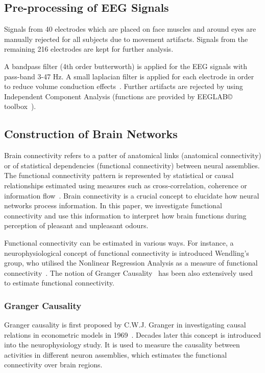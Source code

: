\subsection{Pre-processing of EEG Signals}
Signals from 40 electrodes which are placed on face muscles and around eyes are manually rejected for all subjects due to movement artifacts. Signals from the remaining 216 electrodes are kept for further analysis. 

A bandpass filter (4th order butterworth) is applied for the EEG signals with pass-band 3-47 Hz. A small laplacian filter is applied for each electrode in order to reduce volume conduction effects~\cite{wolters2007volume}. Further artifacts are rejected by using Independent Component Analysis (functions are provided by EEGLAB\copyright~ toolbox~\cite{luck2014introduction}). 

\subsection{Construction of Brain Networks}
Brain connectivity refers to a patter of anatomical links (anatomical connectivity) or of statistical dependencies (functional connectivity) between neural assemblies. The functional connectivity pattern is represented by statistical or causal relationships estimated using measures such as cross-correlation, coherence or information flow~\cite{sporns2007brain}. Brain connectivity is a crucial concept to elucidate how neural networks process information. In this paper, we investigate functional connectivity and use this information to interpret how brain functions during perception of pleasant and unpleasant odours. 

Functional connectivity can be estimated in various ways. For instance, a neurophysiological concept of functional connectivity is introduced Wendling's group, who utilised the Nonlinear Regression Analysis as a measure of functional connectivity~\cite{bettus2008enhanced}. The notion of Granger Causality~\cite{roebroeck2005mapping} has been also extensively used to estimate functional connectivity. 

\subsubsection{Granger Causality}
Granger causality is first proposed by C.W.J. Granger in investigating causal relations in econometric models in 1969~\cite{granger1969investigating}. Decades later this concept is introduced into the neurophysiology study. It is used to measure the causality between activities in different neuron assemblies, which estimates the functional connectivity over brain regions. 

